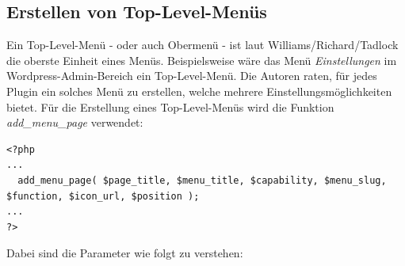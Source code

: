 \subsection{Erstellen von Top-Level-Menüs}\label{ersttlm}
Ein Top-Level-Menü - oder auch Obermenü - ist laut Williams/Richard/Tadlock die oberste Einheit eines Menüs. Beispielsweise wäre das Menü \emph{Einstellungen} im Wordpress-Admin-Bereich ein Top-Level-Menü. Die Autoren raten, für jedes Plugin ein solches Menü zu erstellen, welche mehrere Einstellungsmöglichkeiten bietet.
Für die Erstellung eines Top-Level-Menüs wird die Funktion \emph{add\_menu\_page} verwendet:
\begin{lstlisting}
<?php 
...
  add_menu_page( $page_title, $menu_title, $capability, $menu_slug, $function, $icon_url, $position ); 
...
?>
\end{lstlisting}
Dabei sind die Parameter wie folgt zu verstehen:
